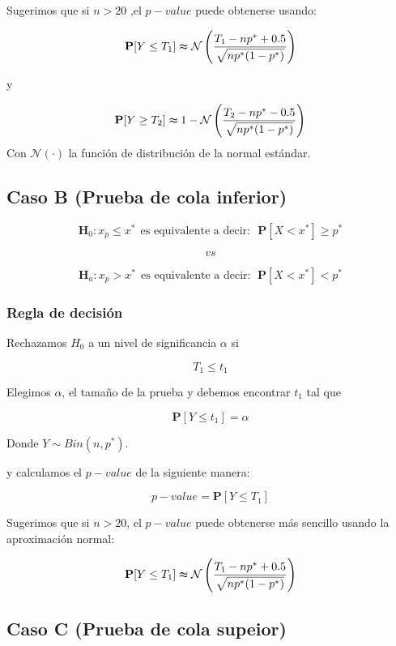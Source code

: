 \documentclass[
  a4paper,
  oneside,
  openany]{book}
\begin{document}
Sugerimos que si \(n > 20\) ,el \(p-value\) puede obtenerse usando:

\[\mathbf{P}[Y\leq T_{1}] \thickapprox \mathcal{N}\left(\frac{T_{1}-np^*+0.5}{\sqrt{np^*(1-p^*)}}\right)\]

y

\[\mathbf{P}[Y\geq T_{2}] \thickapprox 1-\mathcal{N} \left(\frac{T_{2}-np^*-0.5}{\sqrt{np^*(1-p^*)}}\right)\]
Con \(\mathcal{N}(\cdot)\) la función de distribución de la normal estándar.

\hypertarget{caso-b-prueba-de-cola-inferior-1}{%
\subsection*{Caso B (Prueba de cola inferior)}\label{caso-b-prueba-de-cola-inferior-1}}


\[\textbf{H}_0: x_{p} \leq x^* \ \ \mbox{es equivalente a decir:} \ \ \ \mathbf{P}[X < x^*]\geq p^*\]

\[vs\]

\[
\textbf{H}_a: x_{p} > x^* \ \  \mbox{es equivalente a decir}: \ \ \mathbf{P}[X < x^*]< p^*
\]

\hypertarget{regla-de-decisiuxf3n-4}{%
\subsubsection*{Regla de decisión}\label{regla-de-decisiuxf3n-4}}


Rechazamos \(H_0\) a un nivel de significancia \(\alpha\) si

\[T_{1} \leq t_{1}\]

Elegimos \(\alpha\), el tamaño de la prueba y debemos encontrar \(t_{1}\) tal que

\[\mathbf{P}[Y \leq t_{1}]=\alpha\]

Donde \(Y \sim Bin (n,p^*)\).

y calculamos el \(p-value\) de la siguiente manera:

\[p-value= \mathbf{P}[Y\leq T_{1}]\]

Sugerimos que si \(n > 20\), el \(p-value\) puede obtenerse más sencillo usando la aproximación normal:

\[\mathbf{P}[Y\leq T_{1}] \thickapprox \mathcal{N} \left(\frac{T_{1}-np^*+0.5}{\sqrt{np^*(1-p^*)}}\right)\]

\hypertarget{caso-c-prueba-de-cola-supeior}{%
\subsection*{Caso C (Prueba de cola supeior)}\label{caso-c-prueba-de-cola-supeior}}
\end{document}
